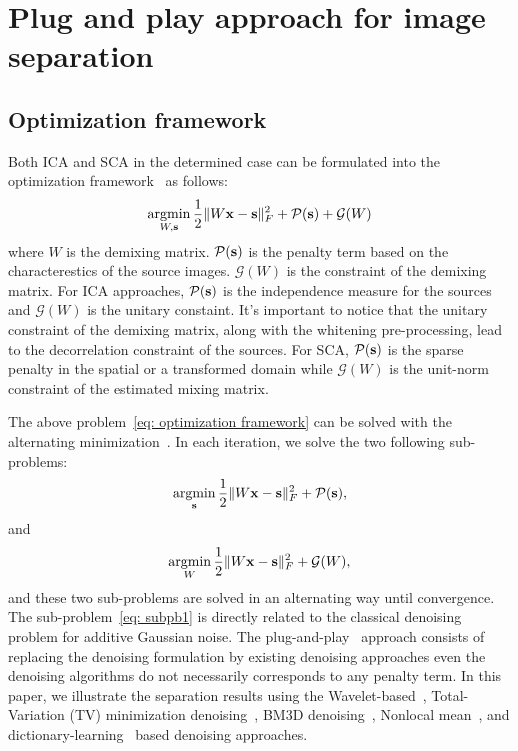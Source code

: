 \documentclass[conference]{IEEEtran}
\newcommand{\argmin}{\mathop{\mathrm{argmin}}}
\theoremstyle{plain}
\begin{document}
\section{Plug and play approach for image separation}
\label{sec: plug and play}

\subsection{Optimization framework}
Both ICA and SCA in the determined case can be formulated into the optimization framework~\cite{feng2018revisiting} as follows:
\begin{equation}
\label{eq: optimization framework}
\argmin_{W, \bs} \frac{1}{2} \|W\bx - \bs\|_F^2 + \mathcal{P}(\bs) + \mathcal{G}(W)
\end{equation}
where $W$ is the demixing matrix. $\mathcal{P}({\mathbf s})$ is the penalty term based on the characterestics of the source images. $\mathcal{G}(W)$ is the constraint of the demixing matrix. For ICA approaches, $\mathcal{P}({\mathbf s})$ is the independence measure for the sources and $\mathcal{G}(W)$ is the unitary constaint. It's important to notice that the unitary constraint of the demixing matrix, along with the whitening pre-processing, lead to the decorrelation constraint of the sources. For SCA, $\mathcal{P}({\mathbf s})$ is the sparse penalty in the spatial or a transformed domain while $\mathcal{G}(W)$ is the unit-norm constraint of the estimated mixing matrix.

The above problem~\eqref{eq: optimization framework} can be solved with the alternating minimization~\cite{tseng2001convergence}. In each iteration, we solve the two following sub-problems:
\begin{equation}
\label{eq: subpb1}
	\argmin_{\bs} \frac{1}{2} \|W\bx - \bs\|_F^2 + \mathcal{P}(\bs),
\end{equation}
and 
\begin{equation}
\label{eq: subpb2}
\argmin_{W} \frac{1}{2} \|W\bx - \bs\|_F^2 + \mathcal{G}(W),
\end{equation}
and these two sub-problems are solved in an alternating way until convergence.
The sub-problem~\eqref{eq: subpb1} is directly related to the classical denoising problem for additive Gaussian noise. The plug-and-play~\cite{venkatakrishnan2013plug,chan2016plug,ono2017primal} approach consists of replacing the denoising formulation by existing denoising approaches even the denoising algorithms do not necessarily corresponds to any penalty term. In this paper, we illustrate the separation results using the Wavelet-based~\cite{donoho1994ideal,chang2000adaptive}, Total-Variation (TV) minimization denoising~\cite{chambolle2004algorithm}, BM3D denoising~\cite{dabov2007image}, Nonlocal mean~\cite{buades2005non}, and dictionary-learning~\cite{elad2006image} based denoising approaches.
\end{document}
